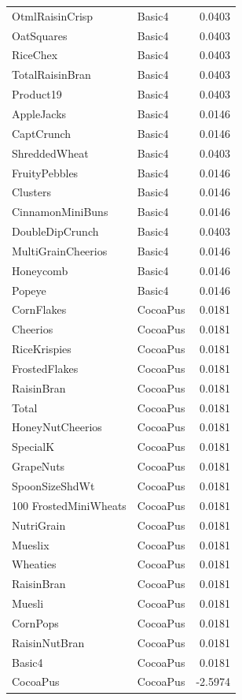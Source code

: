 \begin{longtable}{llr}
OtmlRaisinCrisp & Basic4 & 0.0403 \\
OatSquares & Basic4 & 0.0403 \\
RiceChex & Basic4 & 0.0403 \\
TotalRaisinBran & Basic4 & 0.0403 \\
Product19 & Basic4 & 0.0403 \\
AppleJacks & Basic4 & 0.0146 \\
CaptCrunch & Basic4 & 0.0146 \\
ShreddedWheat & Basic4 & 0.0403 \\
FruityPebbles & Basic4 & 0.0146 \\
Clusters & Basic4 & 0.0146 \\
CinnamonMiniBuns & Basic4 & 0.0146 \\
DoubleDipCrunch & Basic4 & 0.0403 \\
MultiGrainCheerios & Basic4 & 0.0146 \\
Honeycomb & Basic4 & 0.0146 \\
Popeye & Basic4 & 0.0146 \\
CornFlakes & CocoaPus & 0.0181 \\
Cheerios & CocoaPus & 0.0181 \\
RiceKrispies & CocoaPus & 0.0181 \\
FrostedFlakes & CocoaPus & 0.0181 \\
RaisinBran & CocoaPus & 0.0181 \\
Total & CocoaPus & 0.0181 \\
HoneyNutCheerios & CocoaPus & 0.0181 \\
SpecialK & CocoaPus & 0.0181 \\
GrapeNuts & CocoaPus & 0.0181 \\
SpoonSizeShdWt & CocoaPus & 0.0181 \\
100%
FrostedMiniWheats & CocoaPus & 0.0181 \\
NutriGrain & CocoaPus & 0.0181 \\
Mueslix & CocoaPus & 0.0181 \\
Wheaties & CocoaPus & 0.0181 \\
RaisinBran & CocoaPus & 0.0181 \\
Muesli & CocoaPus & 0.0181 \\
CornPops & CocoaPus & 0.0181 \\
RaisinNutBran & CocoaPus & 0.0181 \\
Basic4 & CocoaPus & 0.0181 \\
CocoaPus & CocoaPus & -2.5974 \\

\end{longtable}
